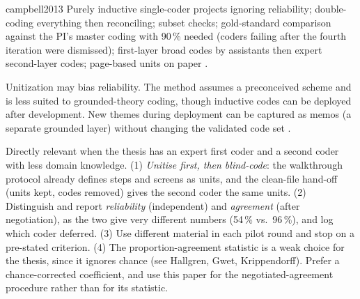 \begin{papercard}{campbell2013}
 Purely inductive single-coder projects ignoring reliability; double-coding everything then reconciling; subset checks; gold-standard comparison against the PI's master coding with 90\,\% needed (coders failing after the fourth iteration were dismissed); first-layer broad codes by assistants then expert second-layer codes; page-based units on paper .

 Unitization may bias reliability. The method assumes a preconceived scheme and is less suited to grounded-theory coding, though inductive codes can be deployed after development. New themes during deployment can be captured as memos (a separate grounded layer) without changing the validated code set .

 Directly relevant when the thesis has an expert first coder and a second coder with less domain knowledge. (1) \emph{Unitise first, then blind-code}: the walkthrough protocol already defines steps and screens as units, and the clean-file hand-off (units kept, codes removed) gives the second coder the same units. (2) Distinguish and report \emph{reliability} (independent) and \emph{agreement} (after negotiation), as the two give very different numbers (54\,\% vs.\ 96\,\%), and log which coder deferred. (3) Use different material in each pilot round and stop on a pre-stated criterion. (4) The proportion-agreement statistic is a weak choice for the thesis, since it ignores chance (see Hallgren, Gwet, Krippendorff). Prefer a chance-corrected coefficient, and use this paper for the negotiated-agreement procedure rather than for its statistic.
\end{papercard}
